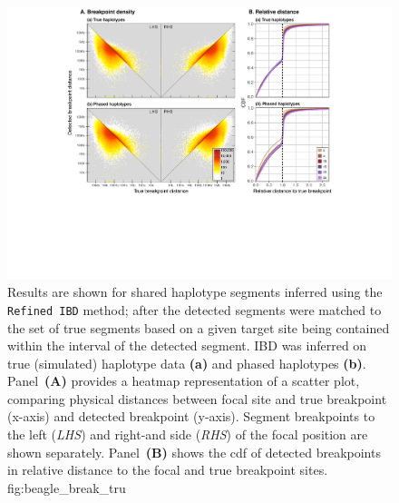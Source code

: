 

\begin{figure}[tb]
\includegraphics[width=\textwidth]{./img/ch3/beagle_break_tru_new}
{Results are shown for shared haplotype segments inferred using the \texttt{Refined\,IBD} method; after the detected segments were matched to the set of true segments based on a given target site being contained within the interval of the detected segment.
IBD was inferred on true (simulated) haplotype data \textbf{(a)} and phased haplotypes \textbf{(b)}.
Panel~\textbf{(A)} provides a heatmap representation of a scatter plot, comparing physical distances between focal site and true breakpoint (x-axis) and detected breakpoint (y-axis).
Segment breakpoints to the left (\emph{LHS}) and right-and side (\emph{RHS}) of the focal position are shown separately.
Panel~\textbf{(B)} shows the \gls{cdf} of detected breakpoints in relative distance to the focal and true breakpoint sites.\CorrectLabel}
{fig:beagle_break_tru}
\end{figure}
